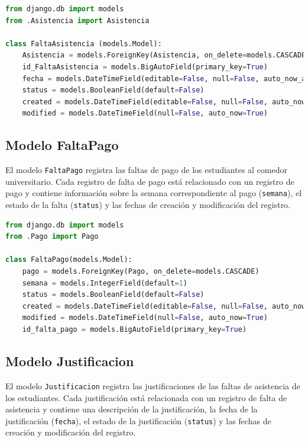 \documentclass{article}
\begin{document}
\begin{lstlisting}[language=Python, caption={FaltaAsistencia}]
from django.db import models
from .Asistencia import Asistencia

class FaltaAsistencia (models.Model):
    Asistencia = models.ForeignKey(Asistencia, on_delete=models.CASCADE)
    id_FaltaAsistencia = models.BigAutoField(primary_key=True)
    fecha = models.DateTimeField(editable=False, null=False, auto_now_add=True)
    status = models.BooleanField(default=False)
    created = models.DateTimeField(editable=False, null=False, auto_now_add=True)
    modified = models.DateTimeField(null=False, auto_now=True)
\end{lstlisting}

\subsection{Modelo FaltaPago}

El modelo \texttt{FaltaPago} registra las faltas de pago de los estudiantes al comedor universitario. Cada registro de falta de pago está relacionado con un registro de pago y contiene información sobre la semana correspondiente al pago (\texttt{semana}), el estado de la falta (\texttt{status}) y las fechas de creación y modificación del registro.

\begin{lstlisting}[language=Python, caption={FaltaPago}]
from django.db import models
from .Pago import Pago

class FaltaPago(models.Model):
    pago = models.ForeignKey(Pago, on_delete=models.CASCADE)
    semana = models.IntegerField(default=1)
    status = models.BooleanField(default=False)
    created = models.DateTimeField(editable=False, null=False, auto_now_add=True)
    modified = models.DateTimeField(null=False, auto_now=True)
    id_falta_pago = models.BigAutoField(primary_key=True)
\end{lstlisting}

\subsection{Modelo Justificacion}

El modelo \texttt{Justificacion} registra las justificaciones de las faltas de asistencia de los estudiantes. Cada justificación está relacionada con un registro de falta de asistencia y contiene una descripción de la justificación, la fecha de la justificación (\texttt{fecha}), el estado de la justificación (\texttt{status}) y las fechas de creación y modificación del registro.
\end{document}
